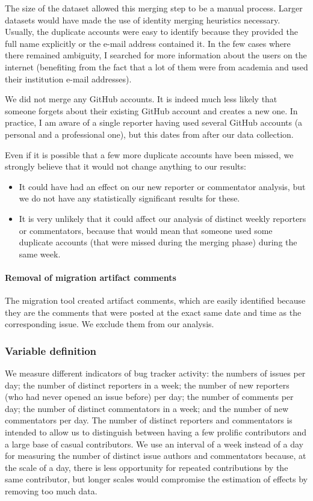 The size of the dataset allowed this merging step to be a manual process. Larger datasets would have made the use of identity merging heuristics necessary. Usually, the duplicate accounts were easy to identify because they provided the full name explicitly or the e-mail address contained it. In the few cases where there remained ambiguity, I searched for more information about the users on the internet (benefiting from the fact that a lot of them were from academia and used their institution e-mail addresses).

We did not merge any GitHub accounts. It is indeed much less likely that someone forgets about their existing GitHub account and creates a new one.
In practice, I am aware of a single reporter having used several GitHub accounts (a personal and a professional one), but this dates from after our data collection.

Even if it is possible that a few more duplicate accounts have been missed, we strongly believe that it would not change anything to our results:

\begin{itemize}
	\item It could have had an effect on our new reporter or commentator analysis, but we do not have any statistically significant results for these.
	\item It is very unlikely that it could affect our analysis of distinct weekly reporters or commentators, because that would mean that someone used some duplicate accounts (that were missed during the merging phase) during the same week.
\end{itemize}

\paragraph{Removal of migration artifact comments}

The migration tool created artifact comments, which are easily identified because they are the comments that were posted at the exact same date and time as the corresponding issue. We exclude them from our analysis.

\subsubsection{Variable definition}

\label{sec:variables}

We measure different indicators of bug tracker activity: the numbers of issues per day; the number of distinct reporters in a week; the number of new reporters (who had never opened an issue before) per day; the number of comments per day; the number of distinct commentators in a week; and the number of new commentators per day. The number of distinct reporters and commentators is intended to allow us to distinguish between having a few prolific contributors and a large base of casual contributors. We use an interval of a week instead of a day for measuring the number of distinct issue authors and commentators because, at the scale of a day, there is less opportunity for repeated contributions by the same contributor, but longer scales would compromise the estimation of effects by removing too much data.

